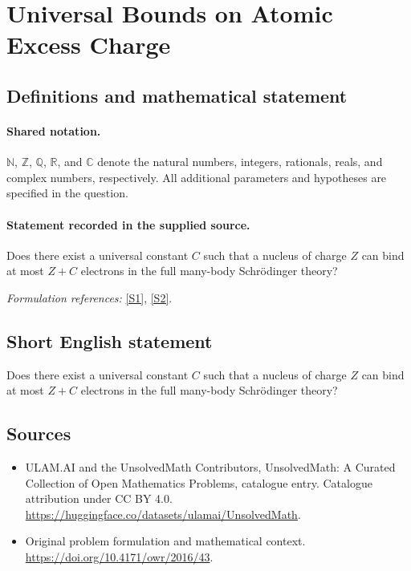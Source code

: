 \documentclass[11pt]{article}
\newcommand{\sref}[2]{\hyperlink{source:#1:#2}{[S#2]}}
\begin{document}
\section{Universal Bounds on Atomic Excess Charge}\label{statement}

\subsection{Definitions and mathematical statement}

\paragraph{Shared notation.}$\mathbb N$, $\mathbb Z$, $\mathbb Q$, $\mathbb R$, and $\mathbb C$ denote the natural numbers, integers, rationals, reals, and complex numbers, respectively. All additional parameters and hypotheses are specified in the question.


\paragraph{Statement recorded in the supplied source.}
Does there exist a universal constant $C$ such that a nucleus of charge $Z$ can bind at most $Z+C$ electrons in the full many-body Schrödinger theory?
\par\smallskip\textit{Formulation references:} \sref{statement}{1}, \sref{statement}{2}.
\subsection{Short English statement}
Does there exist a universal constant $C$ such that a nucleus of charge $Z$ can bind at most $Z+C$ electrons in the full many-body Schrödinger theory?
\subsection{Sources}
\begin{itemize}
\item[\hypertarget{source:statement:1}{S1}] ULAM.AI and the UnsolvedMath Contributors, UnsolvedMath: A Curated Collection of Open Mathematics Problems, catalogue entry. Catalogue attribution under CC BY 4.0.
\url{https://huggingface.co/datasets/ulamai/UnsolvedMath}.
\item[\hypertarget{source:statement:2}{S2}] Original problem formulation and mathematical context.
\url{https://doi.org/10.4171/owr/2016/43}.
\end{itemize}
\label{end:statement}
\end{document}
